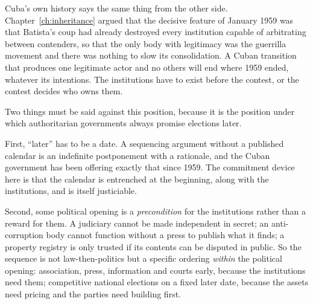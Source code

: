 Cuba's own history says the same thing from the other side. Chapter~\ref{ch:inheritance}
argued that the decisive feature of January 1959 was that Batista's coup had
already destroyed every institution capable of arbitrating between contenders,
so that the only body with legitimacy was the guerrilla movement and there was
nothing to slow its consolidation. A Cuban transition that produces one
legitimate actor and no others will end where 1959 ended, whatever its
intentions. The institutions have to exist before the contest, or the contest
decides who owns them.

Two things must be said against this position, because it is the position under
which authoritarian governments always promise elections later.

First, ``later'' has to be a date. A sequencing argument without a published
calendar is an indefinite postponement with a rationale, and the Cuban
government has been offering exactly that since 1959. The commitment device
here is that the calendar is entrenched at the beginning, along with the
institutions, and is itself justiciable.

Second, some political opening is a \emph{precondition} for the institutions
rather than a reward for them. A judiciary cannot be made independent in secret;
an anti-corruption body cannot function without a press to publish what it
finds; a property registry is only trusted if its contents can be disputed in
public. So the sequence is not law-then-politics but a specific ordering
\emph{within} the political opening: association, press, information and courts
early, because the institutions need them; competitive national elections on a
fixed later date, because the assets need pricing and the parties need building
first.

